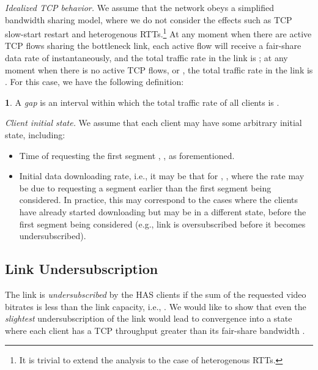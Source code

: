 \documentclass[conference]{IEEEtran}
\theoremstyle{plain}
\theoremstyle{definition}
\newtheorem{defn}[thm]{\protect\definitionname}
\theoremstyle{plain}
\theoremstyle{plain}
\providecommand{\definitionname}{Definition}
\begin{document}
\vspace{0.05in}

\emph{Idealized TCP behavior.} We assume that the network obeys a
simplified bandwidth sharing model, where we do not consider the effects
such as TCP slow-start restart and heterogenous RTTs.\footnote{It is trivial to extend the analysis to the case of heterogenous RTTs.} At any moment  when there are  active TCP flows
sharing the bottleneck link, each active flow will receive a fair-share
data rate of  instantaneously, and the total
traffic rate in the link is ; at any moment when there is no active
TCP flows, or , the total traffic rate in the link is .
For this case, we have the following definition:
\begin{defn}
A \emph{gap} is an interval within which the total traffic rate of
all clients is .
\end{defn}
\vspace{0.05in}

\emph{Client initial state. }We assume that each client may have some
arbitrary initial state, including:
\begin{itemize}
\item Time of requesting the first segment , , as
forementioned.
\item Initial data downloading rate, i.e., it may be that 
for , , where the rate may be due to requesting
a segment earlier than the first segment being considered. In practice,
this may correspond to the cases where the clients have already started
downloading but may be in a different state, before the first segment
being considered (e.g., link is oversubscribed before it becomes undersubscribed).
\end{itemize}

\subsection{Link Undersubscription}

The link is \emph{undersubscribed} by the  HAS clients if the
sum of the requested video bitrates is less than the link capacity,
i.e., . We would like to show that even the
\emph{slightest} undersubscription of the link would lead to convergence
into a state where each client has a TCP throughput greater than its
fair-share bandwidth .
\end{document}
